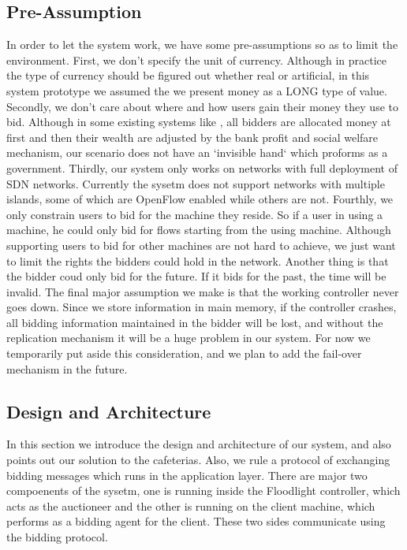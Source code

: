 \documentclass[a4paper,11pt,twocolumn]{article}
\begin{document}
\subsection{Pre-Assumption}
In order to let the system work, we have some pre-assumptions so as to limit the environment. First, we don't specify the unit of 
currency. Although in practice the type of currency should be figured out whether real or artificial, in this system prototype we assumed
the we present money as a LONG type of value. Secondly, we don't care about where and how users gain their money they use to bid. Although in
some existing systems like \cite{ucsd}, all bidders are allocated money at first and then their wealth are adjusted by the bank profit and 
social welfare mechanism, our scenario does not have an `invisible hand` which proforms as a government. Thirdly, our system only works on 
networks with full deployment of SDN networks. Currently the sysetm does not support networks with multiple islands, some of which are 
OpenFlow enabled while others are not. Fourthly, we only constrain users to bid for the machine they reside. 
So if a user in using a machine, he could only bid for flows starting from the using machine. Although supporting
users to bid for other machines are not hard to achieve, we just want to limit the rights the bidders could hold in the network. Another thing 
is that the bidder coud only bid for the future. If it bids for the past, the time will be invalid.
The final major assumption we make is that the working controller never goes down. Since we store 
information in main memory, if the controller crashes, all bidding information maintained in the bidder will be lost, and without the 
replication mechanism it will be a huge problem in our system. For now we temporarily put aside this consideration, and we plan to add
the fail-over mechanism in the future. 



\subsection{Design and Architecture}
In this section we introduce the design and architecture of our system, and also points out our solution to the cafeterias. Also, 
we rule a protocol of exchanging bidding messages which runs in the application layer. There are major two compoenents of the sysetm,
one is running inside the Floodlight controller, which acts as the auctioneer and the other is running on the client machine, 
which performs as a bidding agent for the client. These two sides communicate using the bidding protocol. 
\end{document}
